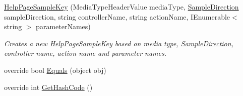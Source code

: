 \begin{DoxyCompactItemize}
\hyperlink{classApi3Layers_1_1Areas_1_1HelpPage_1_1HelpPageSampleKey_a1916dc45ba1af0722c792b7371a1c1ce}{Help\+Page\+Sample\+Key} (Media\+Type\+Header\+Value media\+Type, \hyperlink{namespaceApi3Layers_1_1Areas_1_1HelpPage_abad9f6d2b059d72558bf70415efc32b5}{Sample\+Direction} sample\+Direction, string controller\+Name, string action\+Name, I\+Enumerable$<$ string $>$ parameter\+Names)
\begin{DoxyCompactList}\small\item\em Creates a new \hyperlink{classApi3Layers_1_1Areas_1_1HelpPage_1_1HelpPageSampleKey}{Help\+Page\+Sample\+Key} based on media type, \hyperlink{classApi3Layers_1_1Areas_1_1HelpPage_1_1HelpPageSampleKey_a7f001c7cd8d8d35bc4613b02ca9d639c}{Sample\+Direction}, controller name, action name and parameter names. \end{DoxyCompactList}\item 
override bool \hyperlink{classApi3Layers_1_1Areas_1_1HelpPage_1_1HelpPageSampleKey_aadf763f0213fc2f3875230b06bb0b6cf}{Equals} (object obj)
\item 
override int \hyperlink{classApi3Layers_1_1Areas_1_1HelpPage_1_1HelpPageSampleKey_a77e1afa2b6dee1ed3640da81d7407b42}{Get\+Hash\+Code} ()
\end{DoxyCompactItemize}
